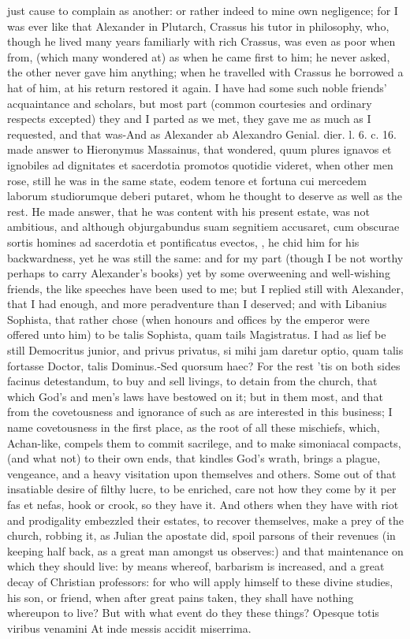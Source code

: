 {just cause to complain as another: or rather indeed to mine own
negligence; for I was ever like that Alexander in Plutarch,
Crassus his tutor in philosophy, who, though he lived many years
familiarly with rich Crassus, was even as poor when from, (which many
wondered at) as when he came first to him; he never asked, the other
never gave him anything; when he travelled with Crassus he borrowed a
hat of him, at his return restored it again. I have had some such noble
friends' acquaintance and scholars, but most part (common courtesies
and ordinary respects excepted) they and I parted as we met, they gave
me as much as I requested, and that was-And as Alexander ab Alexandro
Genial. dier. l. 6. c. 16. made answer to Hieronymus Massainus, that
wondered, quum plures ignavos et ignobiles ad dignitates et sacerdotia
promotos quotidie videret, when other men rose, still he was in the
same state, eodem tenore et fortuna cui mercedem laborum studiorumque
deberi putaret, whom he thought to deserve as well as the rest. He made
answer, that he was content with his present estate, was not ambitious,
and although objurgabundus suam segnitiem accusaret, cum obscurae
sortis homines ad sacerdotia et pontificatus evectos, \etc{}, he chid him
for his backwardness, yet he was still the same: and for my part
(though I be not worthy perhaps to carry Alexander's books) yet by some
overweening and well-wishing friends, the like speeches have been used
to me; but I replied still with Alexander, that I had enough, and more
peradventure than I deserved; and with Libanius Sophista, that rather
chose (when honours and offices by the emperor were offered unto him)
to be talis Sophista, quam tails Magistratus. I had as lief be still
Democritus junior, and privus privatus, si mihi jam daretur optio, quam
talis fortasse Doctor, talis Dominus.-Sed quorsum haec? For the rest
'tis on both sides facinus detestandum, to buy and sell livings, to
detain from the church, that which God's and men's laws have bestowed
on it; but in them most, and that from the covetousness and ignorance
of such as are interested in this business; I name covetousness in the
first place, as the root of all these mischiefs, which, Achan-like,
compels them to commit sacrilege, and to make simoniacal compacts, (and
what not) to their own ends, that kindles God's wrath, brings a
plague, vengeance, and a heavy visitation upon themselves and others.
Some out of that insatiable desire of filthy lucre, to be enriched,
care not how they come by it per fas et nefas, hook or crook, so they
have it. And others when they have with riot and prodigality embezzled
their estates, to recover themselves, make a prey of the church,
robbing it, as Julian the apostate did, spoil parsons of their
revenues (in keeping half back, as a great man amongst us
observes:) and that maintenance on which they should live: by means
whereof, barbarism is increased, and a great decay of Christian
professors: for who will apply himself to these divine studies, his
son, or friend, when after great pains taken, they shall have nothing
whereupon to live? But with what event do they these things?
Opesque totis viribus venamini
At inde messis accidit miserrima.

}
